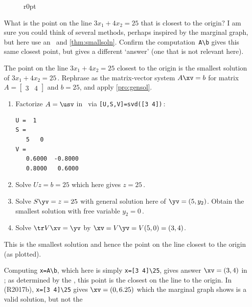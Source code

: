 \begin{figure}r{0pt}
\end{figure}
\begin{example} 
What is the point on the line \(3x_1+4x_2=25\) that is closest to the origin?
I am sure you could think of several methods, perhaps inspired by the marginal graph, but here use an \svd\ and \cref{thm:smallsoln}.
Confirm the \script[2] computation~\verb|A\b| gives this same closest point, but \script[1] gives a different `answer' (one that is not relevant here).

\begin{solution} 
The point on the line \(3x_1+4x_2=25\) closest to the origin is the smallest solution of \(3x_1+4x_2=25\)\,.  
Rephrase as the matrix-vector system \(A\xv=b\) for matrix \(A=\begin{bmatrix} 3&4 \end{bmatrix}\) and \(b=25\), and apply \cref{pro:gensol}.
\begin{enumerate}
\item Factorize \(A=\usv\) in \script\ via \verb|[U,S,V]=svd([3 4])|\,:
\begin{verbatim}
U =  1
S =
   5   0
V =
   0.6000  -0.8000
   0.8000   0.6000
\end{verbatim}
\item Solve \(Uz=b=25\) which here gives \(z=25\)\,.
\item Solve \(S\yv=z=25\) with general solution here of \(\yv=(5,y_2)\). 
Obtain the smallest solution with free variable \(y_2=0\)\,.
\item Solve \(\tr V\xv=\yv\) by \(\xv=V\yv=V(5,0)=(3,4)\).  
\end{enumerate}
This is the smallest solution and hence the point on the line closest to the origin (as plotted).

Computing \verb|x=A\b|, which here is simply \verb|x=[3 4]\25|, gives answer \(\xv=(3,4)\) in \script[2]; as determined by the \svd, this point is the closest on the line to the origin.
In \script[1] (R2017b), \verb|x=[3 4]\25| gives \(\xv=(0,6.25)\) which the marginal graph shows is a valid solution, but not the 
\end{solution}
\end{example}





